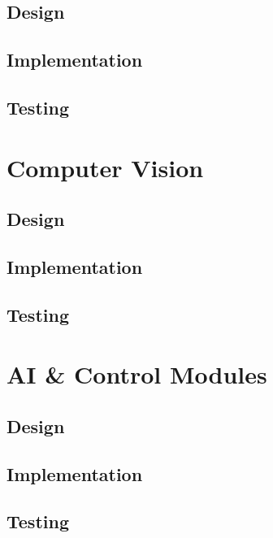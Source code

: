 \subsection{Design}\label{soft/SLAM/design}

\subsection{Implementation}\label{soft/SLAM/impl}

\subsection{Testing}\label{soft/SLAM/test}



\section{Computer Vision}\label{soft/cv}

\subsection{Design}\label{soft/cv/design}

\subsection{Implementation}\label{soft/cv/impl}

\subsection{Testing}\label{soft/cv/test}



\section{AI \& Control Modules}\label{soft/ai}

\subsection{Design}\label{soft/ai/design}

\subsection{Implementation}\label{soft/ai/impl}

\subsection{Testing}\label{soft/ai/test}